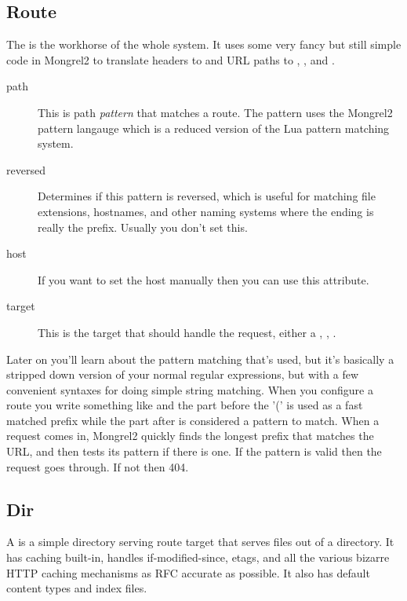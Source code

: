 \subsection{Route}

The  is the workhorse of the whole system.  It uses some very fancy but still simple
code in Mongrel2 to translate  headers to  and URL paths to ,
, and .

\begin{description}
\item[path] This is path \emph{pattern} that matches a route.  The pattern uses the Mongrel2 pattern langauge
    which is a reduced version of the Lua pattern matching system.
\item[reversed] Determines if this pattern is reversed, which is useful for matching file extensions, hostnames,
    and other naming systems where the ending is really the prefix.  Usually you don't set this.
\item[host] If you want to set the host manually then you can use this attribute.
\item[target] This is the target that should handle the request, either a , , .
\end{description}

Later on you'll learn about the pattern matching that's used, but it's basically a stripped down version of your
normal regular expressions, but with a few convenient syntaxes for doing simple string matching.  When you configure
a route you write something like  and the part before the '(' is used as a fast matched
prefix while the part after is considered a pattern to match.  When a request comes in, Mongrel2 quickly finds the
longest prefix that matches the URL, and then tests its pattern if there is one.  If the pattern is valid then the
request goes through.  If not then 404.


\subsection{Dir}

A  is a simple directory serving route target that serves files out of a directory.  It has caching
built-in, handles if-modified-since, etags, and all the various bizarre HTTP caching mechanisms as RFC accurate
as possible.  It also has default content types and index files.

